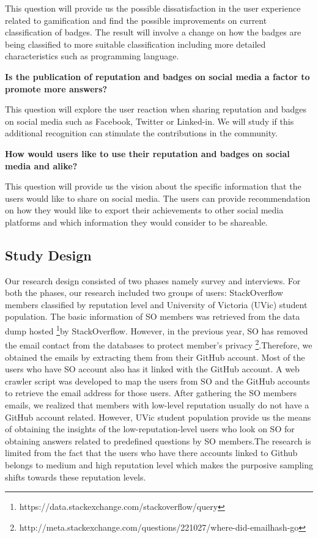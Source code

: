 \documentclass{sigchi}
\begin{document}
This question will provide us the possible dissatisfaction in the user experience related to gamification and find the possible improvements on current classification of badges. The result will involve a change on how the badges are being classified to more suitable classification including more detailed characteristics such as programming language.

\textbf{Is the publication of reputation and badges on social media a
factor to promote more answers?}

This question will explore the user reaction when sharing reputation and badges on social media such as Facebook, Twitter or Linked-in. We will study if this additional recognition can stimulate the contributions in the community.

\textbf{How would users like to use their reputation and badges
on social media and alike?}

This question will provide us the vision about the specific information that the users would like to share on social media. The users can provide recommendation on how they would like to export their achievements to other social media platforms and which information they would consider to be shareable.

\subsection{Study Design}
Our research design consisted of two phases namely survey and interviews. For both the phases, our research included two groups of users: StackOverflow members classified by reputation level and University of Victoria (UVic) student population. The basic information of SO members was retrieved from the data dump hosted \footnote{https://data.stackexchange.com/stackoverflow/query}by StackOverflow. However, in the previous year, SO has removed the email contact from the databases to protect member's privacy \footnote{http://meta.stackexchange.com/questions/221027/where-did-emailhash-go}.Therefore, we obtained the emails by extracting them from their GitHub account. Most of the users who have SO account also has it linked with the GitHub account. A web crawler script was developed to map the users from SO and the GitHub accounts to retrieve the email address for those users. After gathering the SO members emails, we realized that members with low-level reputation usually do not have a GitHub account related. However, UVic student population provide us the means of obtaining the insights of the low-reputation-level users who look on SO for obtaining answers related to predefined questions by SO members.The research is limited from the fact that the users who have there accounts linked to Github belongs to medium and high reputation level which makes the purposive sampling shifts towards these reputation levels.
\end{document}
